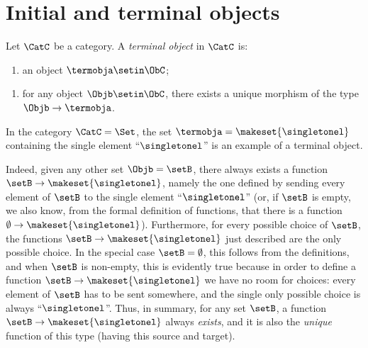 
\section{Initial and terminal objects}
\label{sec:initional-terminal}


\begin{ctdefinition}\label{def:terminal-object}
    Let $\CatC$ be a category.
    A \emph{terminal object} in $\CatC$ is:

    \constit
    \begin{enumerate}
        \item an object $\termobja \setin \ObC$;
    \end{enumerate}
    \condit
    \begin{enumerate}
        \item for any object $\Objb \setin \ObC$, there exists a unique morphism of the type $\Objb \to \termobja$.
    \end{enumerate}
\end{ctdefinition}

\begin{example}\label{exa:terminal-object-in-Set}
    In the category $\CatC = \Set$, the set $\termobja = \makeset{ \singletonel}$ containing the single element ``$\singletonel$'' is an example of a terminal object.

    Indeed, given any other set $\Objb = \setB$, there always exists a function $\setB \to \makeset{ \singletonel}$, namely the one defined by sending every element of $\setB$ to the single element ``$\singletonel$'' (or, if $\setB$ is empty, we also know, from the formal definition of functions, that there is a function $\emptyset \to \makeset{ \singletonel}$).
    Furthermore, for every possible choice of $\setB$, the functions $\setB \to \makeset{ \singletonel}$ just described are the only possible choice.
    In the special case $\setB = \emptyset$, this follows from the definitions, and when $\setB$ is non-empty, this is evidently true because in order to define a function $\setB \to \makeset{ \singletonel}$ we have no room for choices: every element of $\setB$ has to be sent somewhere, and the single only possible choice is always ``$\singletonel$''.
    Thus, in summary, for any set $\setB$, a function $\setB \to \makeset{ \singletonel}$ always \emph{exists}, and it is also the \emph{unique} function of this type (having this source and target).
\end{example}

